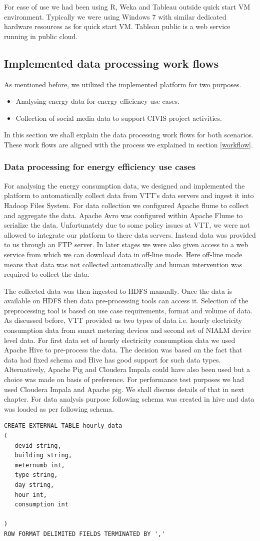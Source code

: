 For ease of use we had been using R, Weka and Tableau outside quick start VM environment. Typically we were using Windows 7 with similar dedicated hardware resources as for quick start VM. Tableau public is a web service running in public cloud.
\subsection{Implemented data processing work flows } 
As mentioned before, we utilized the implemented platform for two purposes.
\begin{itemize}
\item Analysing energy data for energy efficiency use cases.
\item Collection of social media data to support CIVIS project activities. 
\end{itemize}
In this section we shall explain the data processing work flows for both scenarios. These work flows are aligned with the process we explained in section \ref{workflow}. 
\subsubsection{Data processing for energy efficiency use cases}
For analysing the energy consumption data, we designed and implemented the platform to automatically collect data from VTT's data servers and ingest it into Hadoop Files System. For data collection we configured Apache flume to collect and aggregate the data. Apache Avro was configured within Apache Flume to serialize the data. Unfortunately due to some policy issues at VTT, we were not allowed to integrate our platform to there data servers. Instead data was provided to us through an FTP server. In later stages we were also given access to a web service from which we can download data in off-line mode. Here off-line mode means that data was not collected automatically and human intervention was required to collect the data.

The collected data was then ingested to HDFS manually. Once the data is available on HDFS then data pre-processing tools can access it. Selection of the preprocessing tool is based on use case requirements, format and volume of data. As discussed before, VTT provided us two types of data i.e. hourly electricity consumption data from smart metering devices and second set of NIALM device level data. For first data set of hourly electricity consumption data we used Apache Hive to pre-process the data. The decision was based on the fact that data had fixed schema and Hive has good support for such data types. Alternatively, Apache Pig and Cloudera Impala could have also been used but a choice was made on basis of preference. For performance test purposes we had used Cloudera Impala and Apache pig. We shall discuss details of that in next chapter. For data analysis purpose following schema was created in hive and data was loaded as per following schema.
\begin{lstlisting}
CREATE EXTERNAL TABLE hourly_data
(
   devid string,
   building string,
   meternumb int,
   type string,
   day string,
   hour int,
   consumption int

)
ROW FORMAT DELIMITED FIELDS TERMINATED BY ','
\end{lstlisting}

